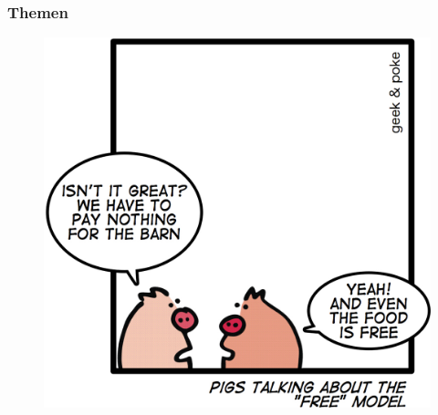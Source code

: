 \documentclass[12pt]{beamer}
\begin{document}
\begin{frame}
  \frametitle{Themen}
  \begin{figure}
    \includegraphics[height=0.7\textheight]{img/business_pigs.jpg}
  \end{figure}
\end{frame}
\end{document}
